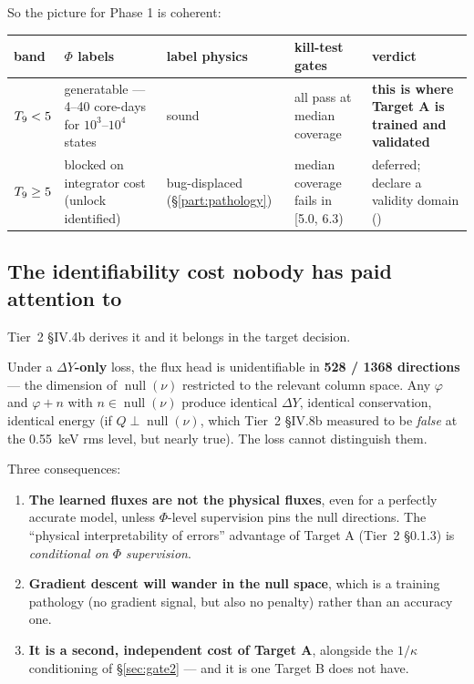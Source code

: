 So the picture for Phase 1 is coherent:

\begingroup\small
\begin{tabularx}{\textwidth}{@{}L{1.5cm} L{3.4cm} L{2.4cm} L{3.0cm} Y@{}}
\toprule
\textbf{band} & \textbf{$\Phi$ labels} & \textbf{label physics} &
  \textbf{kill-test gates} & \textbf{verdict} \\
\midrule
\textbf{$T_{9} < 5$} & generatable --- 4--40 core-days for $10^3$--$10^4$
  states & sound & all pass at median coverage & \textbf{this is where
  Target A is trained and validated} \\
\textbf{$T_{9} \ge 5$} & blocked on integrator cost (unlock identified) &
  bug-displaced (\S\ref{part:pathology}) & median coverage fails in
  [5.0, 6.3) & deferred; declare a validity domain () \\
\bottomrule
\end{tabularx}
\endgroup

\subsection{The identifiability cost nobody has paid attention to}
\label{sec:identifiability}

Tier~2 \S IV.4b derives it and it belongs in the target decision.

Under a \textbf{$\Delta Y$-only} loss, the flux head is unidentifiable in
\textbf{528 / 1368 directions} --- the dimension of $\operatorname{null}(\nu)$
restricted to the relevant column space. Any $\varphi$ and $\varphi + n$ with
$n \in \operatorname{null}(\nu)$ produce identical $\Delta Y$, identical
conservation, identical energy (if $Q \perp \operatorname{null}(\nu)$, which
Tier~2 \S IV.8b measured to be \emph{false} at the 0.55~keV rms level, but
nearly true). The loss cannot distinguish them.

Three consequences:

\begin{enumerate}
\item \textbf{The learned fluxes are not the physical fluxes}, even for a
  perfectly accurate model, unless $\Phi$-level supervision pins the null
  directions. The ``physical interpretability of errors'' advantage of
  Target A (Tier~2 \S 0.1.3) is \emph{conditional on $\Phi$ supervision}.
\item \textbf{Gradient descent will wander in the null space}, which is a
  training pathology (no gradient signal, but also no penalty) rather than an
  accuracy one.
\item \textbf{It is a second, independent cost of Target A}, alongside the
  $1/\kappa$ conditioning of \S\ref{sec:gate2} --- and it is one Target B does
  not have.
\end{enumerate}

